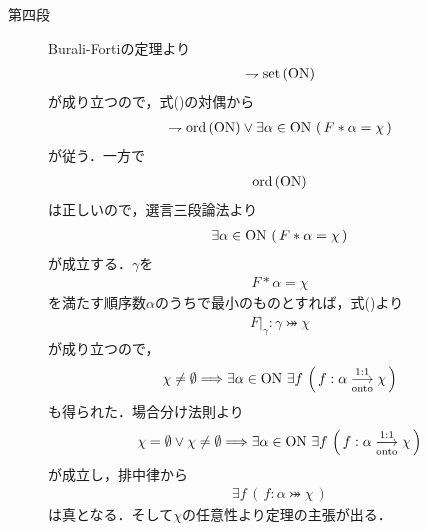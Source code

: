 \begin{prf}
\begin{description}
			\item[第四段]
				Burali-Fortiの定理より
				\begin{align}
					\rightharpoondown \operatorname*{set} \left(\mathrm{ON}\right)
				\end{align}
				が成り立つので，式()の対偶から
				\begin{align}
					\rightharpoondown \operatorname*{ord} \left(\mathrm{ON}\right) \vee 
					\exists \alpha \in \mathrm{ON}\, \left(\, F \ast \alpha = \chi\, \right)
				\end{align}
				が従う．一方で
				\begin{align}
					\operatorname*{ord} \left(\mathrm{ON}\right)
				\end{align}
				は正しいので，選言三段論法より
				\begin{align}
					\exists \alpha \in \mathrm{ON}\, \left(\, F \ast \alpha = \chi\, \right)
				\end{align}
				が成立する．$\gamma$を
				\begin{align}
					F \ast \alpha = \chi
				\end{align}
				を満たす順序数$\alpha$のうちで最小のものとすれば，式()より
				\begin{align}
					F|_\gamma:\gamma \bij \chi
				\end{align}
				が成り立つので，
				\begin{align}
					\chi \neq \emptyset \Longrightarrow \exists \alpha \in \ON\ 
					\exists f\, \left(\, f:\alpha \bij \chi\, \right)
				\end{align}
				も得られた．場合分け法則より
				\begin{align}
					\chi = \emptyset \vee \chi \neq \emptyset \Longrightarrow \exists \alpha \in \ON\ 
					\exists f\, \left(\, f:\alpha \bij \chi\, \right)
				\end{align}
				が成立し，排中律から
				\begin{align}
					\exists f\, \left(\, f:\alpha \bij \chi\, \right)
				\end{align}
				は真となる．そして$\chi$の任意性より定理の主張が出る．
				\QED
		\end{description}
	\end{prf}
	
